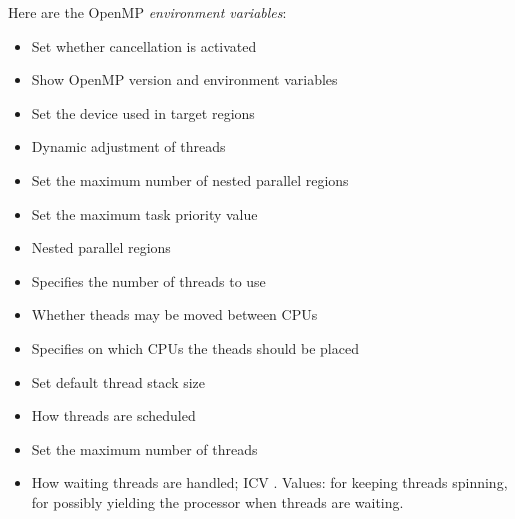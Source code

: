 Here are the OpenMP \emph{environment variables}:
\begin{itemize}
\item {} Set whether cancellation is activated
\item {} Show OpenMP version and environment variables
\item {} Set the device used in target regions
\item {} Dynamic adjustment of threads
\item {} Set the maximum number of nested parallel
  regions
\item {} Set the maximum task priority value
\item {} Nested parallel regions
\item {} Specifies the number of threads to use
\item {} Whether theads may be moved between CPUs
\item {} Specifies on which CPUs the theads should be placed
\item {} Set default thread stack size
\item {} How threads are scheduled
\item {} Set the maximum number of threads
\item {} How waiting threads are
  handled; \ac{ICV} . Values:
   for keeping threads spinning,  for possibly
  yielding the processor when threads are waiting.
\end{itemize}

